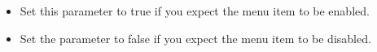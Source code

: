 \begin{itemize}
\item Set this parameter to true if you expect the menu item to be enabled.
\item Set the parameter to false if you expect the menu item to be disabled. 
\end{itemize}
